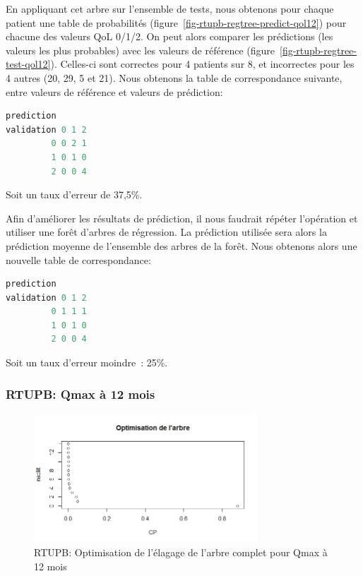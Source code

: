 En appliquant cet arbre sur l'ensemble de tests, nous obtenons pour chaque patient une table de probabilités (figure~\ref{fig-rtupb-regtree-predict-qol12}) pour chacune des valeurs QoL 0/1/2. On peut alors comparer les prédictions (les valeurs les plus probables) avec les valeurs de référence (figure~\ref{fig-rtupb-regtree-test-qol12}). Celles-ci sont correctes pour 4 patients sur 8, et incorrectes pour les 4 autres (20, 29, 5 et 21). Nous obtenons la table de correspondance suivante, entre valeurs de référence et valeurs de prédiction:

\begin{lstlisting}[language=R]
           prediction
validation 0 1 2
         0 0 2 1
         1 0 1 0
         2 0 0 4
\end{lstlisting}
Soit un taux d'erreur de 37,5\%.

Afin d'améliorer les résultats de prédiction, il nous faudrait répéter l'opération et utiliser une forêt d'arbres de régression. La prédiction utilisée sera alors la prédiction moyenne de l'ensemble des arbres de la forêt. Nous obtenons alors une nouvelle table de correspondance:

\begin{lstlisting}[language=R]
          prediction
validation 0 1 2
         0 1 1 1
         1 0 1 0
         2 0 0 4
\end{lstlisting}
Soit un taux d'erreur moindre~: 25\%.


\subsubsection{RTUPB: Qmax à 12 mois}

\begin{figure}[H]
\centering
\includegraphics[width=0.75\textwidth]{../Fig/RTUPB/rtupb-regtree-optim-qmax12.png}
\caption{RTUPB: Optimisation de l'élagage de l'arbre complet pour Qmax à 12 mois}
\label{fig-rtupb-regtree-optim-qmax12}
\end{figure}

